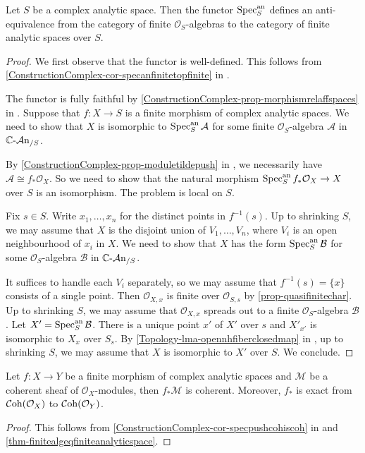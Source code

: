 \begin{thm}\label{thm-finitealgeqfiniteanalyticspace}
    Let $S$ be a complex analytic space. Then the functor $\operatorname{Spec}^{\mathrm{an}}_S$ defines an anti-equivalence from the category of finite $\mathcal{O}_S$-algebras to the category of finite analytic spaces over $S$.
\end{thm}
\begin{proof}
    We first observe that the functor is well-defined. This follows from \cref{ConstructionComplex-cor-specanfinitetopfinite} in .

    The functor is fully faithful by \cref{ConstructionComplex-prop-morphismrelaffspaces} in . Suppose that $f:X\rightarrow S$ is a finite morphism of complex analytic spaces. We need to show that $X$ is isomorphic to $\operatorname{Spec}^{\mathrm{an}}_{S}\mathcal{A}$ for some finite $\mathcal{O}_S$-algebra $\mathcal{A}$ in $\mathbb{C}\text{-}\mathcal{A}\mathrm{n}_{/S}$.

    By \cref{ConstructionComplex-prop-moduletildepush} in , we necessarily have $\mathcal{A}\cong f_*\mathcal{O}_X$. So we need to show that the natural morphism $\operatorname{Spec}_S^{\mathrm{an}} f_*\mathcal{O}_X\rightarrow X$ over $S$ is an isomorphism. The problem is local on $S$. 

    Fix $s\in S$. Write $x_1,\ldots,x_n$ for the distinct points in $f^{-1}(s)$.
    Up to shrinking $S$, we may assume that $X$ is the disjoint union of $V_1,\ldots,V_n$, where $V_i$ is an open neighbourhood of $x_i$ in $X$. 
    We need to show that $X$ has the form $\operatorname{Spec}^{\mathrm{an}}_S \mathcal{B}$ for some $\mathcal{O}_S$-algebra $\mathcal{B}$ in $\mathbb{C}\text{-}\mathcal{A}\mathrm{n}_{/S}$.

    It suffices to handle each $V_i$ separately, so we may assume that $f^{-1}(s)=\{x\}$ consists of a single point. Then $\mathcal{O}_{X,x}$ is finite over $\mathcal{O}_{S,s}$ by \cref{prop-quasifinitechar}. Up to shrinking $S$, we may assume that $\mathcal{O}_{X,x}$ spreads out to a finite $\mathcal{O}_S$-algebra $\mathcal{B}$. Let $X'=\operatorname{Spec}^{\mathrm{an}}_{S}\mathcal{B}$. There is a unique point $x'$ of $X'$ over $s$ and $X'_{x'}$ is isomorphic to $X_x$ over $S_s$. By \cref{Topology-lma-opennhfiberclosedmap} in , up to shrinking $S$, we may assume that $X$ is isomorphic to $X'$ over $S$. We conclude.
\end{proof}

\begin{corollary}\label{cor-finitepushcoh}
    Let $f:X\rightarrow Y$ be a finite morphism of complex analytic spaces and $\mathcal{M}$ be a coherent sheaf of $\mathcal{O}_X$-modules, then $f_*\mathcal{M}$ is coherent. Moreover, $f_*$ is exact from $\mathcal{C}\mathrm{oh}(\mathcal{O}_X)$ to
    $\mathcal{C}\mathrm{oh}(\mathcal{O}_Y)$.
\end{corollary}
\begin{proof}
    This follows from \cref{ConstructionComplex-cor-specpushcohiscoh} in  and \cref{thm-finitealgeqfiniteanalyticspace}.
\end{proof}

